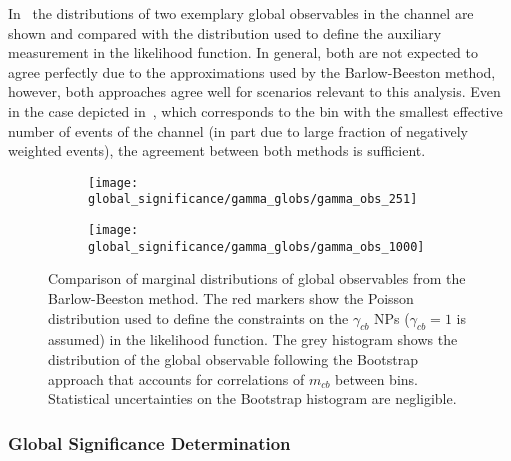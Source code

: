 In~ the distributions of two exemplary
global observables in the \hadhad channel are shown and compared with the
distribution used to define the auxiliary measurement in the likelihood
function. In general, both are not expected to agree perfectly due to the
approximations used by the Barlow-Beeston method, however, both approaches agree
well for scenarios relevant to this analysis. Even in the case depicted
in~, which corresponds to the
bin with the smallest effective number of events of the \hadhad channel (in part
due to large fraction of negatively weighted events), the agreement between both
methods is sufficient.

\begin{figure}[htbp]
  \centering

  \begin{subfigure}{0.485\textwidth}
    \centering

    \texttt{[image: global\_significance/gamma\_globs/gamma\_obs\_251]}
    \label{fig:comparison_bootstrap_poisson_lowest_tau}
  \end{subfigure}\hfill%
  \begin{subfigure}{0.485\textwidth}
    \centering

    \texttt{[image: global\_significance/gamma\_globs/gamma\_obs\_1000]}
  \end{subfigure}

  \caption{Comparison of marginal distributions of global observables from the
    Barlow-Beeston method. The red markers show the Poisson distribution used to
    define the constraints on the $\gamma_{cb}$ NPs ($\gamma_{cb} = 1$ is
    assumed) in the likelihood function. The grey histogram shows the
    distribution of the global observable following the Bootstrap approach that
    accounts for correlations of $m_{cb}$ between bins. Statistical
    uncertainties on the Bootstrap histogram are negligible.}
  \label{fig:comparison_bootstrap_poisson}
\end{figure}


\subsubsection{Global Significance Determination}

